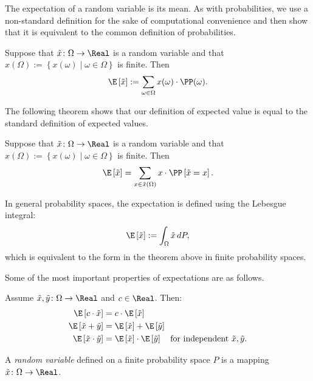 The expectation of a random variable is its mean. As with probabilities, we use a non-standard definition for the sake of computational convenience and then show that it is equivalent to the common definition of probabilities. 
\begin{definition} \label{def:expectation}
Suppose that $\tilde{x}\colon \Omega \to \Real $ is a random variable and that $x(\Omega) := \left\{ x(\omega) \mid  \omega \in \Omega  \right\}$ is finite. Then
\[ 
 \E\left[\tilde{x}\right] := \sum_{\omega \in \Omega }  x(\omega) \cdot  \PP(\omega).
\]
\end{definition}

The following theorem shows that our definition of expected value is equal to the standard definition of expected values. 
\begin{theorem} \label{def:expectation}
Suppose that $\tilde{x}\colon \Omega \to \Real $ is a random variable and that $x(\Omega) := \left\{ x(\omega) \mid  \omega \in \Omega  \right\}$ is finite. Then
\[ 
 \E\left[\tilde{x}\right] = \sum_{x\in \tilde{x}(\Omega)}  x\cdot \PP\left[\tilde{x} = x\right].
\]
\end{theorem}
In general probability spaces, the expectation is defined using the Lebesgue integral:
\[
 \E\left[\tilde{x}\right] := \int_{\Omega} \tilde{x} \, dP,
\]
which is equivalent to the form in the theorem above in finite probability spaces.  

Some of the most important properties of expectations are as follows.
\begin{theorem}
  Assume $\tilde{x},\tilde{y}\colon \Omega \to \Real$ and $c\in \Real $. Then:
  \begin{align*}
    \E\left[c\cdot \tilde{x}\right] &= c \cdot  \E\left[\tilde{x}\right]\\
    \E\left[\tilde{x} + \tilde{y}\right] &= \E\left[\tilde{x}\right] + \E\left[\tilde{y}\right]\\
    \E\left[\tilde{x} \cdot \tilde{y}\right] &= \E\left[\tilde{x}\right] \cdot \E\left[\tilde{y}\right] \quad \text{for independent } \tilde{x}, \tilde{y}.
  \end{align*}
\end{theorem}

\begin{definition}
A \emph{random variable} defined on a finite probability space $P$ is a mapping $\tilde{x}\colon \Omega \to \Real$.
\end{definition}


